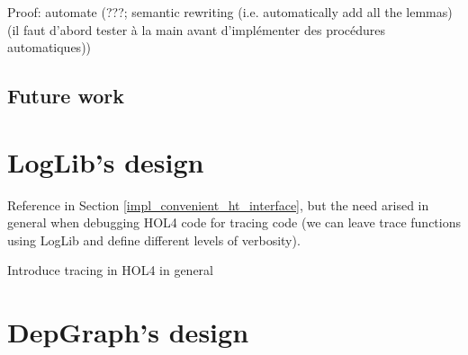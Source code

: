 \documentclass{kththesis}
\begin{document}
Proof: automate (???; semantic rewriting (i.e. automatically add all the lemmas) (il faut d'abord tester à la main avant d'implémenter des procédures automatiques))

\section{Future work}

\printbibliography[heading=bibintoc]

\appendix

\chapter{LogLib's design} \label{annex_loglib}

Reference in Section \ref{impl_convenient_ht_interface}, but the need arised in general when debugging HOL4 code for tracing code (we can leave trace functions using LogLib and define different levels of verbosity).

Introduce tracing in HOL4 in general

\chapter{DepGraph's design} \label{annex_depgraph}

\tailmatter %
\end{document}
